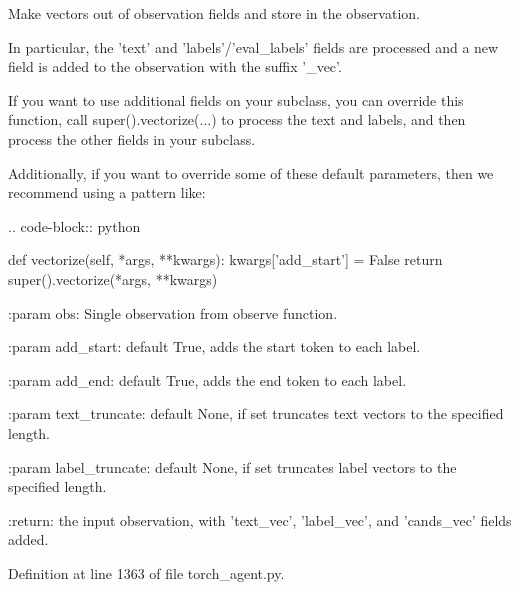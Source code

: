 \begin{DoxyVerb}Make vectors out of observation fields and store in the observation.

In particular, the 'text' and 'labels'/'eval_labels' fields are
processed and a new field is added to the observation with the suffix
'_vec'.

If you want to use additional fields on your subclass, you can override
this function, call super().vectorize(...) to process the text and
labels, and then process the other fields in your subclass.

Additionally, if you want to override some of these default parameters,
then we recommend using a pattern like:

.. code-block:: python

  def vectorize(self, *args, **kwargs):
      kwargs['add_start'] = False
      return super().vectorize(*args, **kwargs)


:param obs:
    Single observation from observe function.

:param add_start:
    default True, adds the start token to each label.

:param add_end:
    default True, adds the end token to each label.

:param text_truncate:
    default None, if set truncates text vectors to the specified
    length.

:param label_truncate:
    default None, if set truncates label vectors to the specified
    length.

:return:
    the input observation, with 'text_vec', 'label_vec', and
    'cands_vec' fields added.
\end{DoxyVerb}
 

Definition at line 1363 of file torch\+\_\+agent.\+py.



